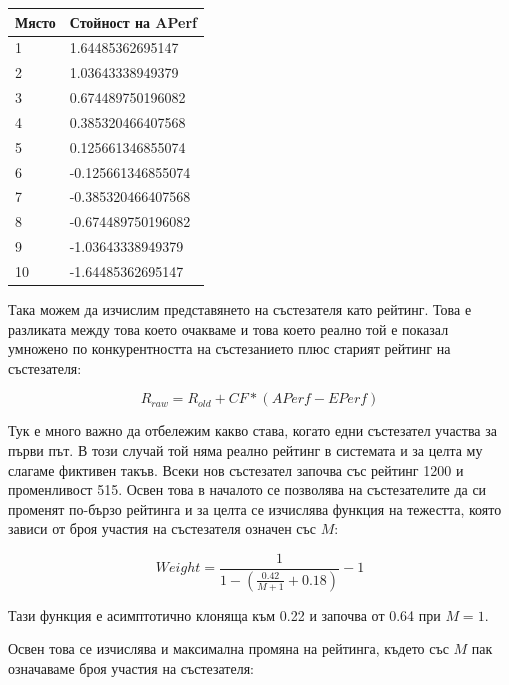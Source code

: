 \documentclass[a4paper,12pt]{article}
\begin{document}
  {\tiny
    \begin{center}
      \begin{tabular}{ | l | l |}
        \hline
        Място & Стойност на APerf \\ \hline
        1 & 1.64485362695147 \\
        2 & 1.03643338949379 \\
        3 & 0.674489750196082 \\
        4 & 0.385320466407568 \\
        5 & 0.125661346855074 \\
        6 & -0.125661346855074 \\
        7 & -0.385320466407568 \\
        8 & -0.674489750196082 \\
        9 & -1.03643338949379 \\
        10 & -1.64485362695147 \\
        \hline
      \end{tabular}
    \end{center}
  }
  
  Така можем да изчислим представянето на състезателя като рейтинг. Това е разликата между това което очакваме и това което реално той е показал умножено по конкурентността на състезанието плюс старият рейтинг на състезателя:
  
  \begin{equation}
    R_{raw} = R_{old} + CF*(APerf - EPerf)
  \end{equation}

  Тук е много важно да отбележим какво става, когато едни състезател участва за първи път. В този случай той няма реално рейтинг в системата и за целта му слагаме фиктивен такъв. Всеки нов състезател започва със рейтинг 1200 и променливост 515. Освен това в началото се позволява на състезателите да си променят по-бързо рейтинга и за целта се изчислява функция на тежестта, която зависи от броя участия на състезателя означен със \(M\):
  
  \begin{equation}
    Weight = \frac{1}{1 - \left(\frac{0.42}{M + 1} + 0.18\right)} - 1
  \end{equation}
  
  Тази функция е асимптотично клоняща към 0.22 и започва от 0.64 при \(M=1\).
  
  Освен това се изчислява и максимална промяна на рейтинга, където със \(M\) пак означаваме броя участия на състезателя:
  
\end{document}
